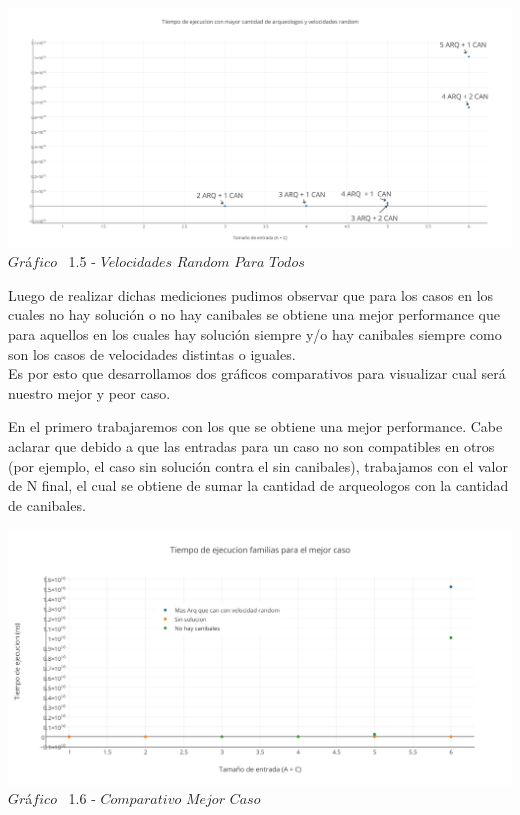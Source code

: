   
   \vspace*{0.3cm} \vspace*{0.3cm}
  \begin{center}
 \includegraphics[scale=0.65]{./EJ1/velrandom.png}
 {$Gr$\'a$fico$ \ 1.5 - $Velocidades$ $Random$ $Para$ $Todos$}
  \end{center}
  \vspace*{0.3cm}
  
Luego de realizar dichas mediciones pudimos observar que para los casos en los cuales no hay soluci\'on o no hay canibales se obtiene una mejor performance que para aquellos en los cuales hay soluci\'on siempre y/o hay canibales siempre como son los casos de velocidades distintas o iguales. \\
Es por esto que desarrollamos dos gr\'aficos comparativos para visualizar cual ser\'a nuestro mejor y peor caso.

En el primero trabajaremos con los que se obtiene una mejor performance. Cabe aclarar que debido a que las entradas para un caso no son compatibles en otros (por ejemplo, el caso sin soluci\'on contra el sin canibales), trabajamos con el valor de N final, el cual se obtiene de sumar la cantidad de arqueologos con la cantidad de canibales.\\

   \vspace*{0.3cm} \vspace*{0.3cm}
  \begin{center}
 \includegraphics[scale=0.65]{./EJ1/comparativomejorcaso.png}
 {$Gr$\'a$fico$ \ 1.6 - $Comparativo$ $Mejor$ $Caso$}
  \end{center}
  \vspace*{0.3cm}

